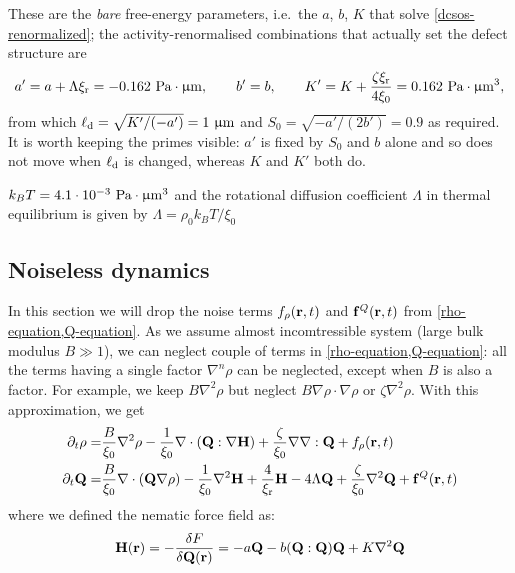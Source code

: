 \documentclass[a5paper]{article}
\begin{document}
These are the \emph{bare} free-energy parameters, i.e.\ the $a$, $b$, $K$ that solve \eqref{dcsos-renormalized}; the activity-renormalised combinations that actually set the defect structure are
\begin{align}
    \label{primed-values}
    a' = a + \Lambda \xi_{\rm r} = -0.162 ~\text{Pa} \cdot \upmu\mathrm{m},
    \qquad
    b' = b,
    \qquad
    K' = K + \frac{\zeta\xi_{\rm r}}{4\xi_0} = 0.162 ~\text{Pa} \cdot \upmu\mathrm{m}^3,
\end{align}
from which $\ell_{\rm d} = \sqrt{K'/(-a')} = 1~\upmu\mathrm{m}$ and $S_0 = \sqrt{-a'/(2b')} = 0.9$ as required. It is worth keeping the primes visible: $a'$ is fixed by $S_0$ and $b$ alone and so does not move when $\ell_{\rm d}$ is changed, whereas $K$ and $K'$ both do.


$k_B T = 4.1 \cdot 10^{-3} ~\text{Pa} \cdot \upmu\mathrm{m}^3$
and the rotational diffusion coefficient $\Lambda$ in thermal equilibrium is given by $\Lambda = \rho_0 k_B T / \xi_0$



\subsection{Noiseless dynamics}
\label{sec-noiseless-dynamics}
In this section we will drop the noise terms $f_\rho(\mathbf{r}, t)$ and $\mathbf{f}^Q(\mathbf{r}, t)$ from \cref{rho-equation,Q-equation}. As we assume almost incomtressible system (large bulk modulus $B\gg 1$), we can neglect couple of terms in \cref{rho-equation,Q-equation}: all the terms having a single factor $\nabla^n \rho$ can be neglected, except when $B$ is also a factor. For example, we keep $B \nabla^2 \rho$ but neglect $B \nabla \rho \cdot \nabla \rho$ or $\zeta \nabla^2 \rho$.
With this approximation, we get 
\begin{subequations}
    \label{equations-2}
\begin{align}
    \label{rho-equation-2}
    \partial_t \rho =& \frac{B}{\xi_0}\nabla^2 \rho - \frac{1}{\xi_0} \nabla\cdot \left(\mathbf{Q}:\nabla \mathbf{H}\right) + \frac{\zeta}{\xi_0} \nabla\nabla:\mathbf{Q} + f_\rho(\mathbf{r}, t)
    \\
    \label{Q-equation-2}
    \partial_t \mathbf{Q} =& \frac{B}{\xi_0} \nabla\cdot \left(\mathbf{Q} \nabla \rho\right) 
    -\frac{1}{\xi_0} \nabla^2 \mathbf{H} + \frac{4}{\xi_{\rm r}}\mathbf{H} - 4\Lambda \mathbf{Q}
    +\frac{\zeta}{\xi_0}\nabla^2\mathbf{Q} + \mathbf{f}^Q(\mathbf{r}, t)
\end{align}
\end{subequations}
where we defined the nematic force field as:
\begin{align}
    \label{nematic-force-field}
    \mathbf{H}(\mathbf{r}) = -\frac{\delta F}{\delta \mathbf{Q}(\mathbf{r})} = -a \mathbf{Q} - b (\mathbf{Q}:\mathbf{Q}) \mathbf{Q} + K \nabla^2 \mathbf{Q}
\end{align}
\end{document}
